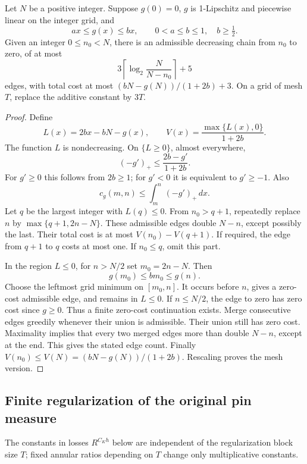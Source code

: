 \begin{lemma}\label{fprof:chain}
Let \(N\) be a positive integer. Suppose \(g(0)=0\), \(g\) is 1-Lipschitz and piecewise linear on the integer grid, and
$$
 ax\leq g(x)\leq bx,\qquad
 0<a\leq b\leq1,\quad b\geq\tfrac12.
$$
Given an integer \(0\leq n_0<N\), there is an admissible decreasing chain from \(n_0\) to zero, of at most
$$
 3\left\lceil\log_2\frac{N}{N-n_0}\right\rceil+5
$$
edges, with total cost at most \((bN-g(N))/(1+2b)+3\).
On a grid of mesh \(T\), replace the additive constant by \(3T\).
\end{lemma}
\begin{proof}
Define
$$
 L(x)=2bx-bN-g(x),\qquad V(x)=\frac{\max\{L(x),0\}}{1+2b}.
$$
The function \(L\) is nondecreasing. On \(\{L\geq0\}\), almost everywhere,
$$
 (-g')_+\leq\frac{2b-g'}{1+2b}.
$$
For \(g'\geq0\) this follows from \(2b\geq1\); for \(g'<0\) it is equivalent to \(g'\geq-1\). Also
$$
 c_g(m,n)\leq\int_m^n(-g')_+\,dx.
$$
Let \(q\) be the largest integer with \(L(q)\leq0\). From \(n_0>q+1\), repeatedly replace \(n\) by \(\max\{q+1,2n-N\}\). These admissible edges double \(N-n\), except possibly the last. Their total cost is at most \(V(n_0)-V(q+1)\). If required, the edge from \(q+1\) to \(q\) costs at most one. If \(n_0\leq q\), omit this part.

In the region \(L\leq0\), for \(n>N/2\) set \(m_0=2n-N\). Then
$$
 g(m_0)\leq bm_0\leq g(n).
$$
Choose the leftmost grid minimum on \([m_0,n]\). It occurs before \(n\), gives a zero-cost admissible edge, and remains in \(L\leq0\). If \(n\leq N/2\), the edge to zero has zero cost since \(g\geq0\). Thus a finite zero-cost continuation exists. Merge consecutive edges greedily whenever their union is admissible. Their union still has zero cost. Maximality implies that every two merged edges more than double \(N-n\), except at the end. This gives the stated edge count. Finally \(V(n_0)\leq V(N)=(bN-g(N))/(1+2b)\). Rescaling proves the mesh version.
\end{proof}



\subsection{Finite regularization of the original pin measure}

The constants in losses \(R^{C_Kh}\) below are independent of the
regularization block size \(T\); fixed annular ratios depending on
\(T\) change only multiplicative constants.

